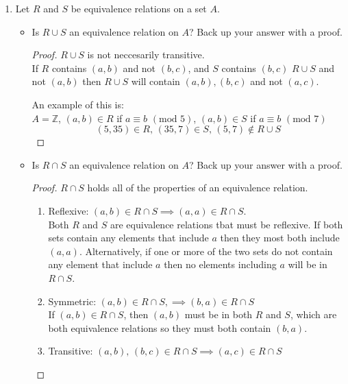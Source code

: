 \documentclass[12pt,a4paper,reqno,parskip=full]{amsart}
\numberwithin{equation}{section}
\theoremstyle{plain}
\theoremstyle{definition}
\begin{document}
\begin{enumerate}
\begin{proof}
        \end{proof}
  \item Let $R$ and $S$ be equivalence relations on a set $A$.
        \begin{itemize}
          \item Is $R\cup S$ an equivalence relation on $A$? Back up your answer with a proof.
                \begin{proof}
                  $R\cup S$ is not neccesarily transitive. \\
                  If $R$ contains $(a,b)$ and not $(b,c)$, and $S$ contains
                  $(b,c)$ $R\cup S$ and not $(a, b)$ then $R\cup S$ will contain
                  $(a,b),(b,c)$ and not $(a,c)$.

                  An example of this is: \\
                  $A=\mathbb{Z}$,
                  $(a,b)\in R$ if $a \equiv b\,\,(\text{mod}\,\,5)$,
                  $(a,b)\in S$ if $a \equiv b\,\,(\text{mod}\,\,7)$
                  \[(5,35)\in R,\,(35,7)\in S,\,(5,7)\notin R\cup S\]
                \end{proof}
          \item Is $R\cap S$ an equivalence relation on $A$? Back up your answer with a proof.
                \begin{proof} $R\cap S$ holds all of the properties of an equivalence relation.
                  \begin{enumerate}[i]
                    \item Reflexive: $(a,b)\in R\cap S\implies (a,a)\in R\cap S$. \\
                          Both $R$ and $S$ are equivalence relations tbat must be reflexive. If both
                          sets contain any elements that include $a$ then they most both include
                          $(a,a)$. Alternatively, if one or more of the two sets do not contain any
                          element that include $a$ then no elements including $a$ will be in
                          $R\cap S$.
                    \item Symmetric: $(a, b)\in R\cap S,\implies (b, a)\in R\cap S$ \\
                          If $(a, b)\in R\cap S$, then $(a,b)$ must be in both $R$ and $S$, which
                          are both equivalence relations so they must both contain $(b,a)$.
                    \item Transitive: $(a,b),\,(b,c)\in R\cap S\implies (a,c)\in R\cap S$ \\

\end{enumerate}
\end{proof}
\end{itemize}
\end{enumerate}
\end{document}
